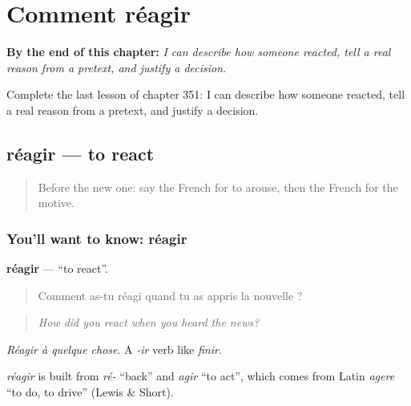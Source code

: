 
\chapter{Comment réagir}
\label{ch:fr-comment-reagir}

\begin{chapteropening}
\textbf{By the end of this chapter:} \emph{I can describe how someone reacted, tell a real reason from a pretext, and justify a decision.}

Complete the last lesson of chapter 351: I can describe how someone reacted, tell a real reason from a pretext, and justify a decision.
\end{chapteropening}

\section[réagir]{réagir — to react}

\label{lesson:FR-C351-reagir}



\begin{quote}
Before the new one: say the French for to arouse, then the French for the motive.
\end{quote}

\subsection*{You'll want to know: réagir}
\textbf{réagir} — \textquotedblleft{}to react\textquotedblright{}.

\begin{quote}
Comment as-tu réagi quand tu as appris la nouvelle ?
\end{quote}

\begin{quote}
\emph{How did you react when you heard the news?}
\end{quote}

\emph{Réagir à quelque chose}. A \emph{-ir} verb like \emph{finir}.

\begin{cousinweb}
\emph{réagir} is built from \emph{ré-} \textquotedblleft{}back\textquotedblright{} and \emph{agir} \textquotedblleft{}to act\textquotedblright{}, which comes from Latin \emph{agere} \textquotedblleft{}to do, to drive\textquotedblright{} (Lewis \& Short).
\end{cousinweb}


